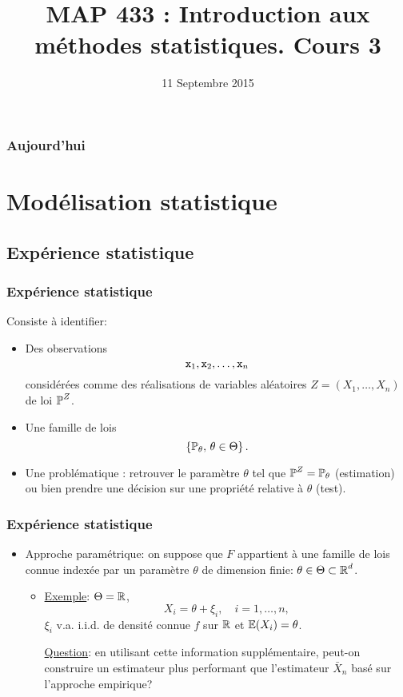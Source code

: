 ﻿


\title{MAP 433 : Introduction aux méthodes statistiques. Cours 3}

\date{11 Septembre 2015}
\maketitle



\begin{frame}
\frametitle{Aujourd'hui}
\tableofcontents
\end{frame}
\section{Modélisation statistique}
\subsection{Expérience statistique}
\begin{frame}
\frametitle{Expérience statistique} Consiste à identifier:
\begin{itemize}
\item \alert{Des observations}
$${\tt x}_1,{\tt x}_2,\ldots, {\tt x}_n$$
\alert{considérées} comme des \alert{ réalisations} de variables aléatoires $Z = (X_1,\ldots, X_n)$ de loi $\operatorname{{\mathbb P}}^Z$.
\item \alert{Une famille de lois}
$$\left\{\operatorname{{\mathbb P}}_\theta,\,\theta \in \Theta\right\}.$$
\item \alert{Une problématique} : retrouver le paramètre
$\theta$ tel que $\operatorname{{\mathbb P}}^Z=\operatorname{{\mathbb P}}_\theta$ (estimation) ou bien prendre une décision sur une propriété relative à $\theta$ (test).
\end{itemize}
\end{frame}

\begin{frame}
\frametitle{Expérience statistique}
\begin{itemize}
\item Approche param\'etrique: \alert{ on suppose} que $F$ appartient \`a une
\alert{ famille de lois connue} index\'ee par un param\`etre
$\theta$ de dimension finie: $\theta\in \Theta \subset \operatorname{{\mathbb R}}^d$.
\begin{itemize}
\item \underline{Exemple}: $\Theta = \operatorname{{\mathbb R}}$,
$$ X_i= \theta +\xi_i, \quad i=1,\dots,n,$$
$\xi_i$ v.a. i.i.d. de densit\'e \alert{ connue} $f$ sur $\operatorname{{\mathbb R}}$
et $\operatorname{{\mathbb E}}(X_i)=\theta$.

\underline{Question}: en utilisant cette information
suppl\'ementaire, peut-on construire un estimateur plus performant
que l'estimateur $\bar X_n$ bas\'e sur l'approche empirique?
\end{itemize}
%
\end{itemize}
\end{frame}


